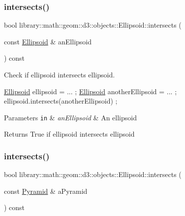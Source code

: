 \subsubsection{\texorpdfstring{intersects()}{intersects()}\hspace{0.1cm}{\footnotesize\ttfamily [8/10]}}
{\footnotesize\ttfamily bool library\+::math\+::geom\+::d3\+::objects\+::\+Ellipsoid\+::intersects (\begin{DoxyParamCaption}\item[{const \hyperlink{classlibrary_1_1math_1_1geom_1_1d3_1_1objects_1_1_ellipsoid}{Ellipsoid} \&}]{an\+Ellipsoid }\end{DoxyParamCaption}) const}



Check if ellipsoid intersects ellipsoid. 


\begin{DoxyCode}
\hyperlink{classlibrary_1_1math_1_1geom_1_1d3_1_1objects_1_1_ellipsoid_aae81fe0edc7f0e8d4590ea89ae73cb14}{Ellipsoid} ellipsoid = ... ;
\hyperlink{classlibrary_1_1math_1_1geom_1_1d3_1_1objects_1_1_ellipsoid_aae81fe0edc7f0e8d4590ea89ae73cb14}{Ellipsoid} anotherEllipsoid = ... ;
ellipsoid.intersects(anotherEllipsoid) ;
\end{DoxyCode}



\begin{DoxyParams}[1]{Parameters}
\mbox{\tt in}  & {\em an\+Ellipsoid} & An ellipsoid \\
\hline
\end{DoxyParams}
\begin{DoxyReturn}{Returns}
True if ellipsoid intersects ellipsoid 
\end{DoxyReturn}
\mbox{\label{classlibrary_1_1math_1_1geom_1_1d3_1_1objects_1_1_ellipsoid_a05dc13a49a72cb23046ff5735072765b}} 
\subsubsection{\texorpdfstring{intersects()}{intersects()}\hspace{0.1cm}{\footnotesize\ttfamily [9/10]}}
{\footnotesize\ttfamily bool library\+::math\+::geom\+::d3\+::objects\+::\+Ellipsoid\+::intersects (\begin{DoxyParamCaption}\item[{const \hyperlink{classlibrary_1_1math_1_1geom_1_1d3_1_1objects_1_1_pyramid}{Pyramid} \&}]{a\+Pyramid }\end{DoxyParamCaption}) const}



